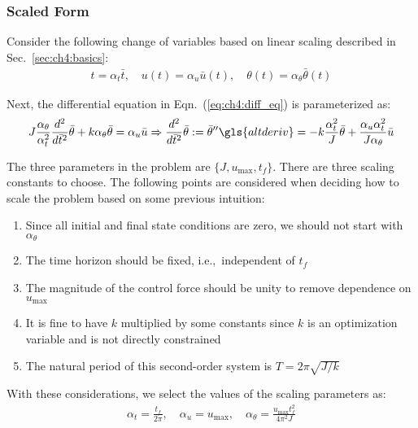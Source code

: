 \subsubsection{Scaled Form}

Consider the following change of variables based on linear scaling described in Sec.~\ref{sec:ch4:basics}:
\begin{gather}
t = \alpha_t \bar{t}, \quad u(t) = \alpha_{u} \bar{u}(t), \quad \theta(t) = \alpha_{\theta} \bar{\theta}(t)
\end{gather}

\noindent Next, the differential equation in Eqn.~(\ref{eq:ch4:diff_eq}) is parameterized as:
\begin{align}
J \frac{\alpha_{\theta}}{\alpha_t^2} \frac{d^2}{d\bar{t}^2}{\bar{\theta}} + k \alpha_{\theta}  \bar{\theta} = \alpha_u \bar{u}
\Rightarrow
\frac{d^2}{d\bar{t}^2}{\bar{\theta}} := {\bar{\theta}}''\gls{altderiv} = -k \frac{\alpha_t^2}{J} \bar{\theta} +  \frac{\alpha_u \alpha_t^2}{J \alpha_{\theta}} \bar{u}
\end{align}

\noindent The three parameters in the problem are $\{J, u_{\max}, t_f \}$.
There are three scaling constants to choose.
The following points are considered when deciding how to scale the problem based on some previous intuition:
\begin{enumerate}[label=$\bullet$, widest=$\bullet$, nosep]
\item Since all initial and final state conditions are zero, we should not start with $\alpha_\theta$
\item The time horizon should be fixed, i.e.,~independent of $t_f$
\item The magnitude of the control force should be unity to remove dependence on $u_{\max}$
\item It is fine to have $k$ multiplied by some constants since $k$ is an optimization variable and is not directly constrained
\item The natural period of this second-order system is $T = 2\pi \sqrt{{J}/{k}}$
\end{enumerate}

\noindent With these considerations, we select the values of the scaling parameters as:
\begin{align}
\alpha_t = \frac{t_f}{2\pi}, \quad \alpha_u = u_{\max}, \quad \alpha_\theta = \frac{u_{\max} t_f^2}{4 \pi^2 J} 
\end{align}

